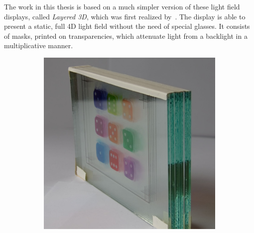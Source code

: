 The work in this thesis is based on a much simpler version of these light field displays, called \emph{Layered 3D}, which was first realized by~\cite{WetzsteinTomo}.
The display is able to present a static, full 4D light field without the need of special glasses.
It consists of masks, printed on transparencies, which attenuate light from a backlight in a multiplicative manner.

\begin{figure}
	\centering
	\begin{subfigure}[t]{.49\textwidth}
		\centering
		\includegraphics[width = \textwidth]{../Figures/hand_craft/glass_plates_front_view_cropped}
		\caption{}
		\label{fig:attenuation_layers_and_glasses}
	\end{subfigure}
	\hfill
	\begin{subfigure}[t]{.49\textwidth}
		 \centering

\end{subfigure}
\end{figure}
